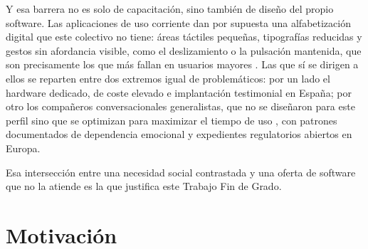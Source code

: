 Y esa barrera no es solo de capacitación, sino también de diseño del propio software. Las aplicaciones de uso corriente dan por supuesta una alfabetización digital que este colectivo no tiene: áreas táctiles pequeñas, tipografías reducidas y gestos sin afordancia visible, como el deslizamiento o la pulsación mantenida, que son precisamente los que más fallan en usuarios mayores \citep{Kane2019}. Las que sí se dirigen a ellos se reparten entre dos extremos igual de problemáticos: por un lado el hardware dedicado, de coste elevado e implantación testimonial en España; por otro los compañeros conversacionales generalistas, que no se diseñaron para este perfil sino que se optimizan para maximizar el tiempo de uso \citep{Zhou2020}, con patrones documentados de dependencia emocional y expedientes regulatorios abiertos en Europa.

Esa intersección entre una necesidad social contrastada y una oferta de software que no la atiende es la que justifica este Trabajo Fin de Grado.

\section{Motivación}

